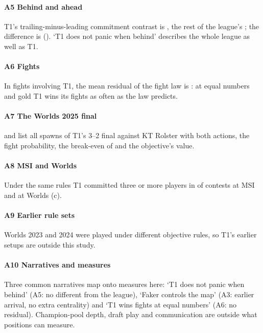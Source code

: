 \paragraph*{A5 Behind and ahead}
T1's trailing-minus-leading commitment contrast is  , the rest of the league's ; the difference is   ().
`T1 does not panic when behind' describes the whole league as well as T1.

\paragraph*{A6 Fights}
In  fights involving T1, the mean residual of the fight law is  : at equal numbers and gold T1 wins its fights as often as the law predicts.

\paragraph*{A7 The Worlds 2025 final}
 and  list all  spawns of T1's 3--2 final against KT Rolster with both actions, the fight probability, the break-even of  and the objective's value.


\paragraph*{A8 MSI and Worlds}
Under the same rules T1 committed three or more players in  of contests at MSI and  at Worlds (c).

\paragraph*{A9 Earlier rule sets}
Worlds 2023 and 2024 were played under different objective rules, so T1's earlier setups are outside this study.

\paragraph*{A10 Narratives and measures}
Three common narratives map onto measures here: `T1 does not panic when behind' (A5: no different from the league), `Faker controls the map' (A3: earlier arrival, no extra centrality) and `T1 wins fights at equal numbers' (A6: no residual).
Champion-pool depth, draft play and communication are outside what positions can measure.

